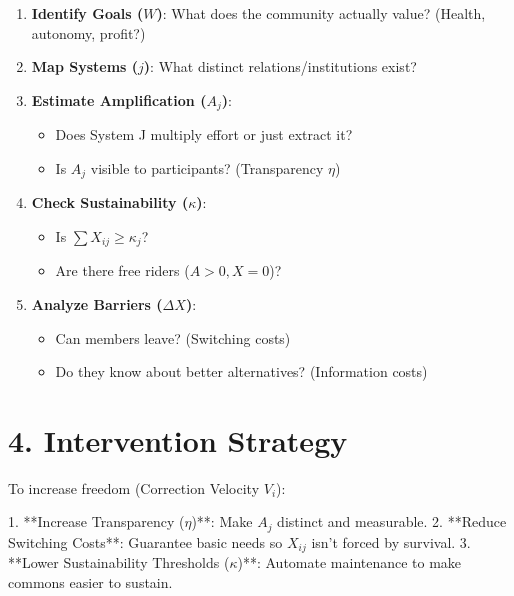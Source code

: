 \documentclass{article}
\begin{document}
\begin{enumerate}
    \item \textbf{Identify Goals ($W$)}: What does the community actually value? (Health, autonomy, profit?)
    \item \textbf{Map Systems ($j$)}: What distinct relations/institutions exist?
    \item \textbf{Estimate Amplification ($A_j$)}:
        \begin{itemize}
            \item Does System J multiply effort or just extract it?
            \item Is $A_j$ visible to participants? (Transparency $\eta$)
        \end{itemize}
    \item \textbf{Check Sustainability ($\kappa$)}:
        \begin{itemize}
            \item Is $\sum X_{ij} \ge \kappa_j$?
            \item Are there free riders ($A > 0, X=0$)?
        \end{itemize}
    \item \textbf{Analyze Barriers ($\Delta X$)}:
        \begin{itemize}
            \item Can members leave? (Switching costs)
            \item Do they know about better alternatives? (Information costs)
        \end{itemize}
\end{enumerate}

\section*{4. Intervention Strategy}

To increase freedom (Correction Velocity $V_i$):

1.  **Increase Transparency ($\eta$)**: Make $A_j$ distinct and measurable.
2.  **Reduce Switching Costs**: Guarantee basic needs so $X_{ij}$ isn't forced by survival.
3.  **Lower Sustainability Thresholds ($\kappa$)**: Automate maintenance to make commons easier to sustain.
\end{document}
